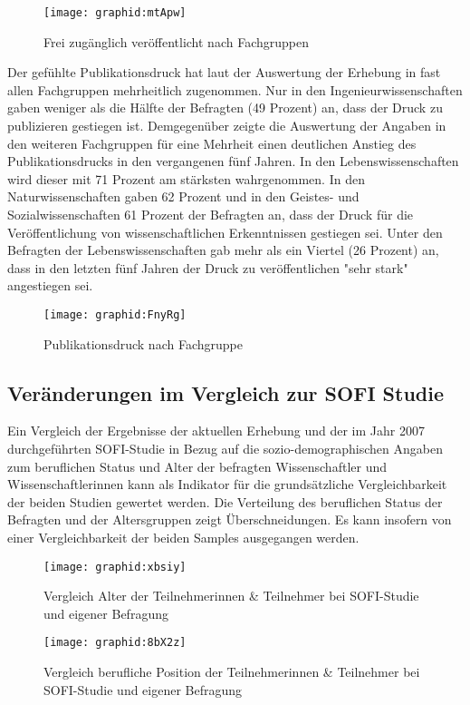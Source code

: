 \begin{figure}[h!]
\texttt{[image: graphid:mtApw]}
\caption{Frei zugänglich veröffentlicht nach Fachgruppen}
\end{figure}

Der gefühlte Publikationsdruck hat laut der Auswertung der Erhebung in fast allen Fachgruppen mehrheitlich zugenommen. Nur in den Ingenieurwissenschaften gaben weniger als die Hälfte der Befragten (49 Prozent) an, dass der Druck zu publizieren gestiegen ist. Demgegenüber zeigte die Auswertung der Angaben in den weiteren Fachgruppen für eine Mehrheit einen deutlichen Anstieg des Publikationsdrucks in den vergangenen fünf Jahren. In den Lebenswissenschaften wird dieser mit 71 Prozent am stärksten wahrgenommen. In den Naturwissenschaften gaben 62 Prozent und in den Geistes- und Sozialwissenschaften 61 Prozent der Befragten an, dass der Druck für die Veröffentlichung von wissenschaftlichen Erkenntnissen gestiegen sei. Unter den Befragten der Lebenswissenschaften gab mehr als ein Viertel (26 Prozent) an, dass in den letzten fünf Jahren der Druck zu veröffentlichen "sehr stark" angestiegen sei.

\begin{figure}[h!]
\texttt{[image: graphid:FnyRg]}
\caption{Publikationsdruck nach Fachgruppe}
\end{figure}

\subsection{Veränderungen im Vergleich zur SOFI Studie}

Ein Vergleich der Ergebnisse der aktuellen Erhebung und der im Jahr 2007 durchgeführten SOFI-Studie in Bezug auf die sozio-demographischen Angaben zum beruflichen Status und Alter der befragten Wissenschaftler und Wissenschaftlerinnen kann als Indikator für die grundsätzliche Vergleichbarkeit der beiden Studien gewertet werden. Die Verteilung des beruflichen Status der Befragten und der Altersgruppen zeigt Überschneidungen. Es kann insofern von einer Vergleichbarkeit der beiden Samples ausgegangen werden.

\begin{figure}[h!]
\texttt{[image: graphid:xbsiy]}
\caption{Vergleich Alter der Teilnehmerinnen & Teilnehmer bei SOFI-Studie und eigener Befragung}
\end{figure}

\begin{figure}[h!]
\texttt{[image: graphid:8bX2z]}
\caption{Vergleich berufliche Position der Teilnehmerinnen & Teilnehmer bei SOFI-Studie und eigener Befragung}
\end{figure}


